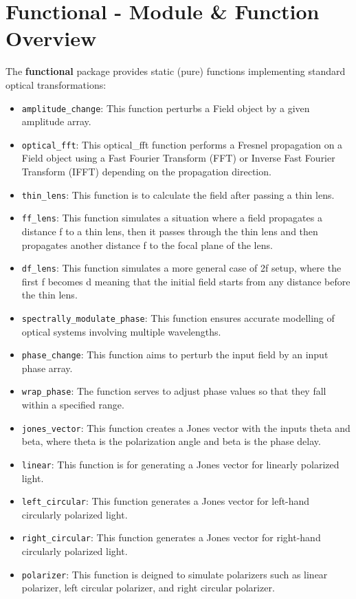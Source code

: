 \documentclass[a4paper,12pt]{report}
\begin{document}
\section{Functional - Module \& Function Overview}
The \textbf{functional} package provides static (pure) functions implementing standard optical transformations:
\begin{itemize}
    \item \texttt{amplitude\_change}: This function perturbs a Field object by a given amplitude array.
    \item \texttt{optical\_fft}: This optical\_fft function performs a Fresnel propagation on a Field object using a Fast Fourier Transform (FFT) or Inverse Fast Fourier Transform (IFFT) depending on the propagation direction.
    \item \texttt{thin\_lens}: This function is to calculate the field after passing a thin lens.
    \item \texttt{ff\_lens}: This function simulates a situation where a field propagates a distance f to a thin lens, then it passes through the thin lens and then propagates another distance f to the focal plane of the lens.
    \item \texttt{df\_lens}: This function simulates a more general case of 2f setup, where the first f becomes d meaning that the initial field starts from any distance before the thin lens.
    \item \texttt{spectrally\_modulate\_phase}: This function ensures accurate modelling of optical systems involving multiple wavelengths.
    \item \texttt{phase\_change}: This function aims to perturb the input field by an input phase array.
    \item \texttt{wrap\_phase}: The function serves to adjust phase values so that they fall within a specified range.
    \item \texttt{jones\_vector}: This function creates a Jones vector with the inputs theta and beta, where theta is the polarization angle and beta is the phase delay.
    \item \texttt{linear}: This function is for generating a Jones vector for linearly polarized light.
    \item \texttt{left\_circular}: This function generates a Jones vector for left-hand circularly polarized light.
    \item \texttt{right\_circular}: This function generates a Jones vector for right-hand circularly polarized light.
    \item \texttt{polarizer}: This function is deigned to simulate polarizers such as linear polarizer, left circular polarizer, and right circular polarizer.

\end{itemize}
\end{document}
